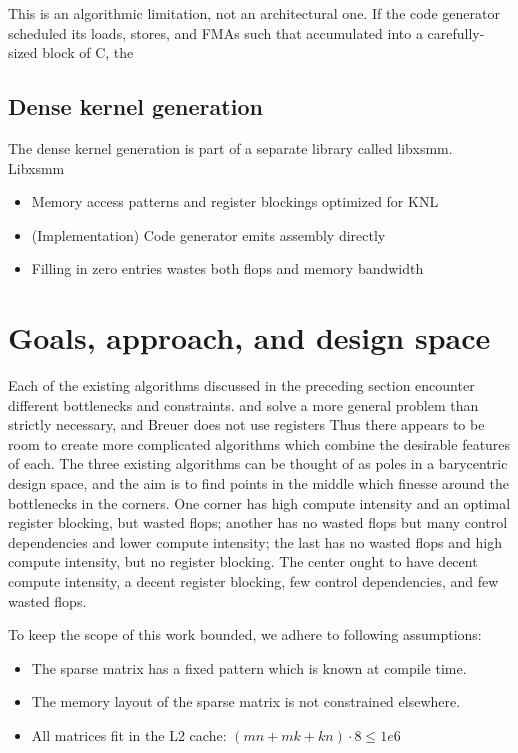       This is an algorithmic limitation, not an architectural one. If the code generator scheduled its loads, stores, and FMAs such that accumulated into a carefully-sized block of C, the 



\subsection{Dense kernel generation}

    The dense kernel generation is part of a separate library called libxsmm.~\cite{Heinecke:2016:LAS:3014904.3015017} Libxsmm 

    \begin{itemize}
      \item Memory access patterns and register blockings optimized for KNL

      \item (Implementation) Code generator emits assembly directly 

      \item Filling in zero entries wastes both flops and memory bandwidth

    \end{itemize}




  \section{Goals, approach, and design space}

  Each of the existing algorithms discussed in the preceding section encounter different bottlenecks and constraints.  and  solve a more general problem than strictly necessary, and Breuer does not use registers Thus there appears to be room to create more complicated algorithms which combine the desirable features of each. The three existing algorithms can be thought of as poles in a barycentric design space, and the aim is to find points in the middle which finesse around the bottlenecks in the corners. One corner has high compute intensity and an optimal register blocking, but wasted flops; another has no wasted flops but many control dependencies and lower compute intensity; the last has no wasted flops and high compute intensity, but no register blocking. The center ought to have decent compute intensity, a decent register blocking, few control dependencies, and few wasted flops. 


  To keep the scope of this work bounded, we adhere to following assumptions:
  \begin{itemize}
    \item The sparse matrix has a fixed pattern which is known at compile time.
    \item The memory layout of the sparse matrix is not constrained elsewhere.
    \item All matrices fit in the L2 cache: $(mn + mk + kn)\cdot 8 \leq 1e6$
  \end{itemize}

